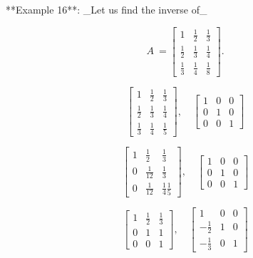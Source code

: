 **Example 16**: _Let us find the inverse of_

\[A\ =\begin{bmatrix}1&\frac{1}{2}&\frac{1}{3}\\ \frac{1}{2}&\frac{1}{3}&\frac{1}{4}\\ \frac{1}{3}&\frac{1}{4}&\frac{1}{8}\end{bmatrix}.\]

\[\begin{bmatrix}1&\frac{1}{2}&\frac{1}{3}\\ \frac{1}{2}&\frac{1}{3}&\frac{1}{4}\\ \frac{1}{3}&\frac{1}{4}&\frac{1}{5}\end{bmatrix},\quad\begin{bmatrix}1&0&0\\ 0&1&0\\ 0&0&1\end{bmatrix}\]

\[\begin{bmatrix}1&\frac{1}{2}&\frac{1}{3}\\ 0&\frac{1}{12}&\frac{1}{3}\\ 0&\frac{1}{12}&\frac{1}{4}\frac{1}{5}\end{bmatrix},\quad\begin{bmatrix}1&0&0\\ 0&1&0\\ 0&0&1\end{bmatrix}\]

\[\begin{bmatrix}1&\frac{1}{2}&\frac{1}{3}\\ 0&1&1\\ 0&0&1\end{bmatrix},\quad\begin{bmatrix}1&0&0\\ -\frac{1}{2}&1&0\\ -\frac{1}{3}&0&1\end{bmatrix}\] 